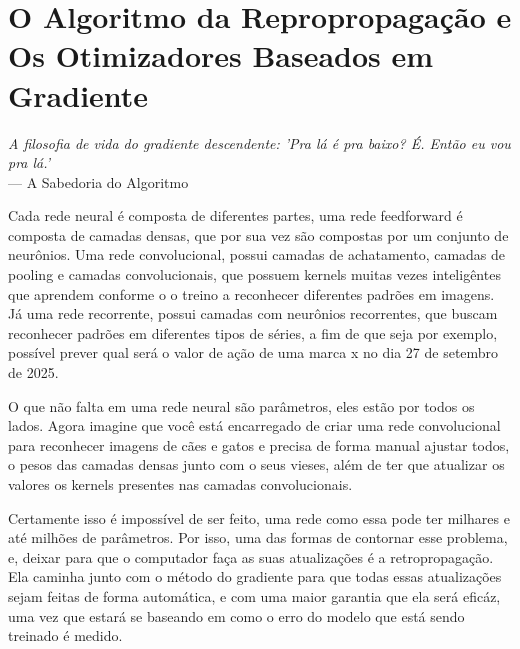
\chapter{O Algoritmo da Repropropagação e Os Otimizadores Baseados em Gradiente}
\label{cap:retropropagacao-gradiente}

\begin{flushright}
\textit{A filosofia de vida do gradiente descendente: 'Pra lá é pra baixo? É. Então eu vou pra lá.'} \\
--- A Sabedoria do Algoritmo
\end{flushright}


Cada rede neural é composta de diferentes partes, uma rede feedforward é composta de camadas densas, que por sua vez são compostas por um conjunto de neurônios. Uma rede convolucional, possui camadas de achatamento, camadas de pooling e camadas convolucionais, que possuem kernels muitas vezes inteligêntes que aprendem conforme o o treino a reconhecer diferentes padrões em imagens. Já uma rede recorrente, possui camadas com neurônios recorrentes, que buscam reconhecer padrões em diferentes tipos de séries, a fim de que seja por exemplo, possível prever qual será o valor de ação de uma marca x no dia 27 de setembro de 2025.

O que não falta em uma rede neural são parâmetros, eles estão por todos os lados. Agora imagine que você está encarregado de criar uma rede convolucional para reconhecer imagens de cães e gatos e precisa de forma manual ajustar todos, o pesos das camadas densas junto com o seus vieses, além de ter que atualizar os valores os kernels presentes nas camadas convolucionais.

Certamente isso é impossível de ser feito, uma rede como essa pode ter milhares e até milhões de parâmetros. Por isso, uma das formas de contornar esse problema, e, deixar para que o computador faça as suas atualizações é a retropropagação. Ela caminha junto com o método do gradiente para que todas essas atualizações sejam feitas de forma automática, e com uma maior garantia que ela será eficáz, uma vez que estará se baseando em como o erro do modelo que está sendo treinado é medido.

